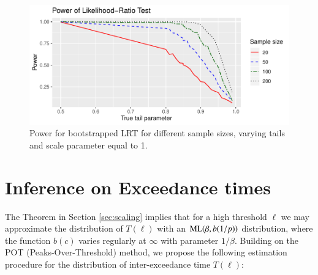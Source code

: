 \documentclass[]{elsarticle} %
\providecommand{\DIFaddtex}[1]{{\protect\color{blue}\uwave{#1}}} %
\providecommand{\DIFdeltex}[1]{{\protect\color{red}\sout{#1}}}                      %
\providecommand{\DIFaddbegin}{} %
\providecommand{\DIFaddend}{} %
\providecommand{\DIFdelbegin}{} %
\providecommand{\DIFdelend}{} %
\providecommand{\DIFadd}[1]{\texorpdfstring{\DIFaddtex{#1}}{#1}} %
\providecommand{\DIFdel}[1]{\texorpdfstring{\DIFdeltex{#1}}{}} %
\newcommand{\DIFscaledelfig}{0.5}
\newlength{\DIFdelgraphicswidth} %
\newlength{\DIFdelgraphicsheight} %
\newcommand{\DIFaddincludegraphics}[2][]{{\color{blue}\fbox{\DIFOincludegraphics[#1]{#2}}}} %
\newcommand{\DIFdelincludegraphics}[2][]{%
\sbox{\DIFdelgraphicsbox}{\DIFOincludegraphics[#1]{#2}}%
\settoboxwidth{\DIFdelgraphicswidth}{\DIFdelgraphicsbox} %
\settoboxtotalheight{\DIFdelgraphicsheight}{\DIFdelgraphicsbox} %
\scalebox{\DIFscaledelfig}{%
\parbox[b]{\DIFdelgraphicswidth}{\usebox{\DIFdelgraphicsbox}\\[-\baselineskip] \rule{\DIFdelgraphicswidth}{0em}}\llap{\resizebox{\DIFdelgraphicswidth}{\DIFdelgraphicsheight}{%
\setlength{\unitlength}{\DIFdelgraphicswidth}%
\begin{picture}(1,1)%
\thicklines\linethickness{2pt} %
{\color[rgb]{1,0,0}\put(0,0){\framebox(1,1){}}}%
{\color[rgb]{1,0,0}\put(0,0){\line( 1,1){1}}}%
{\color[rgb]{1,0,0}\put(0,1){\line(1,-1){1}}}%
\end{picture}%
}\hspace*{3pt}}} %
} %
\DeclareRobustCommand{\DIFaddbegin}{\DIFOaddbegin \let\includegraphics\DIFaddincludegraphics} %
\DeclareRobustCommand{\DIFaddend}{\DIFOaddend \let\includegraphics\DIFOincludegraphics} %
\DeclareRobustCommand{\DIFdelbegin}{\DIFOdelbegin \let\includegraphics\DIFdelincludegraphics} %
\DeclareRobustCommand{\DIFdelend}{\DIFOaddend \let\includegraphics\DIFOincludegraphics} %
\begin{document}
\begin{figure}

{\centering \includegraphics[width=0.9\linewidth]{article_springer_files/figure-latex/LRT_power-1} 

}

\caption{\label{Fig:LRT} Power for bootstrapped LRT for different sample sizes, varying tails and scale parameter equal to 1.}\label{fig:LRT_power}
\end{figure}

\hypertarget{inference-on-exceedance-times}{%
\section{Inference on Exceedance
times}\label{inference-on-exceedance-times}}

The Theorem in Section \ref{sec:scaling} implies that for a high
threshold \(\ell\) we may approximate the distribution of \(T(\ell)\)
with an \DIFdelbegin \DIFdel{\({\rm ML}(\beta, b(1/p))\) }\DIFdelend \DIFaddbegin \DIFadd{\({\rm ML}(\beta, b(1/p_{\ell}))\) }\DIFaddend distribution, where the
function \(b(c)\) varies regularly at \(\infty\) with parameter
\(1/\beta\). Building on the POT (Peaks-Over-Threshold) method, we
propose the following estimation procedure for the distribution of
inter-exceedance time \(T(\ell)\):
\end{document}
